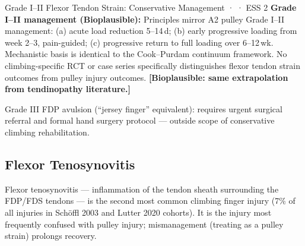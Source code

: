 \begin{bioplausbox}{Grade I--II Flexor Tendon Strain: Conservative Management · \bioplausible · ESS 2}
\textbf{Grade I--II management (Bioplausible):} Principles mirror A2 pulley Grade I--II management: (a) acute load reduction 5--14\,d; (b) early progressive loading from week 2--3, pain-guided; (c) progressive return to full loading over 6--12\,wk. Mechanistic basis is identical to the Cook--Purdam continuum framework. No climbing-specific RCT or case series specifically distinguishes flexor tendon strain outcomes from pulley injury outcomes. \textbf{[Bioplausible: same extrapolation from tendinopathy literature.]}
\end{bioplausbox}

Grade III FDP avulsion (``jersey finger'' equivalent): requires urgent surgical referral and formal hand surgery protocol --- outside scope of conservative climbing rehabilitation.

\subsection{Flexor Tenosynovitis}
\label{subsec:tenosynovitis}

Flexor tenosynovitis --- inflammation of the tendon sheath surrounding the FDP/FDS tendons --- is the second most common climbing finger injury (7\% of all injuries in Sch\"{o}ffl 2003 \cite{SHWS03} and Lutter 2020 \cite{SSF+20} cohorts). It is the injury most frequently confused with pulley injury; mismanagement (treating as a pulley strain) prolongs recovery.

